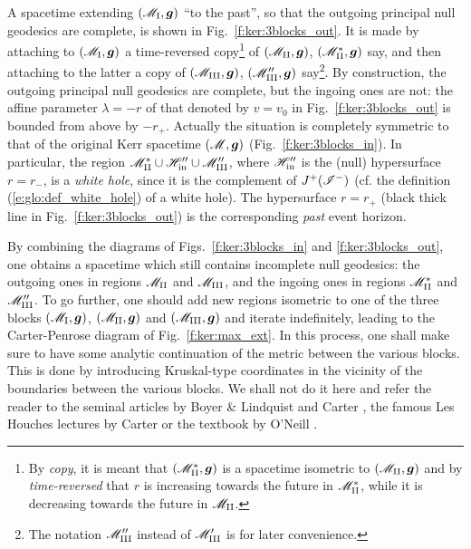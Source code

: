 A spacetime extending $(\mathscr{M}_{\rm I},\bm{g})$ ``to the past'', so that
the outgoing principal null geodesics are complete, is shown in
Fig.~\ref{f:ker:3blocks_out}. It is made by attaching to $(\mathscr{M}_{\rm I},\bm{g})$
a time-reversed copy\footnote{By \emph{copy}, it is meant
that $(\mathscr{M}_{\rm II}^*,\bm{g})$ is a spacetime isometric to $(\mathscr{M}_{\rm II},\bm{g})$
and by \emph{time-reversed} that $r$ is increasing towards
the future in $\mathscr{M}_{\rm II}^*$, while it is decreasing towards the future
in $\mathscr{M}_{\rm II}$.}
 of $(\mathscr{M}_{\rm II},\bm{g})$, $(\mathscr{M}_{\rm II}^*,\bm{g})$ say,
and then attaching to the latter a copy of $(\mathscr{M}_{\rm III},\bm{g})$, $(\mathscr{M}''_{\rm III},\bm{g})$ say\footnote{The notation
$\mathscr{M}''_{\rm III}$ instead of $\mathscr{M}'_{\rm III}$ is for later convenience.}.
By construction, the outgoing principal null geodesics are complete, but
the ingoing ones are not: the affine parameter $\lambda=-r$ of that
denoted by $v=v_0$ in Fig.~\ref{f:ker:3blocks_out} is bounded from above by $-r_+$. Actually the
situation is completely symmetric to that of the original Kerr
spacetime $(\mathscr{M},\bm{g})$ (Fig.~\ref{f:ker:3blocks_in}). In particular,
the region $\mathscr{M}_{\rm II}^*\cup\mathscr{H}''_{\rm in}\cup \mathscr{M}''_{\rm III}$, where
$\mathscr{H}''_{\rm in}$ is the (null) hypersurface $r=r_-$, is a
\emph{white hole},
since it is the complement of $J^+(\mathscr{I}^-)$ (cf. the definition (\ref{e:glo:def_white_hole})
of a white hole). The hypersurface $r=r_+$ (black thick line in  Fig.~\ref{f:ker:3blocks_out}) is the corresponding
\emph{past} event horizon.

By combining the diagrams of Figs.~\ref{f:ker:3blocks_in} and
\ref{f:ker:3blocks_out}, one obtains a spacetime which still
contains incomplete null geodesics: the outgoing ones in regions
$\mathscr{M}_{\rm II}$ and $\mathscr{M}_{\rm III}$, and the ingoing ones in regions
$\mathscr{M}_{\rm II}^*$ and $\mathscr{M}''_{\rm III}$. To go further, one should add
new regions isometric to one of the three blocks
$(\mathscr{M}_{\rm I},\bm{g})$, $(\mathscr{M}_{\rm II},\bm{g})$ and $(\mathscr{M}_{\rm III},\bm{g})$
and iterate indefinitely, leading to the
Carter-Penrose diagram of Fig.~\ref{f:ker:max_ext}.
In this process, one shall make sure to have some analytic continuation
of the metric between the various blocks. This is done by introducing
Kruskal-type coordinates in the vicinity of the boundaries between
the various blocks. We shall not do it here and refer the reader to
the seminal articles by Boyer \& Lindquist \cite{BoyerL67} and Carter \cite{Carte68},
the famous Les Houches lectures by Carter \cite{Carte73a} or
the textbook by O'Neill \cite{ONeil95}.

